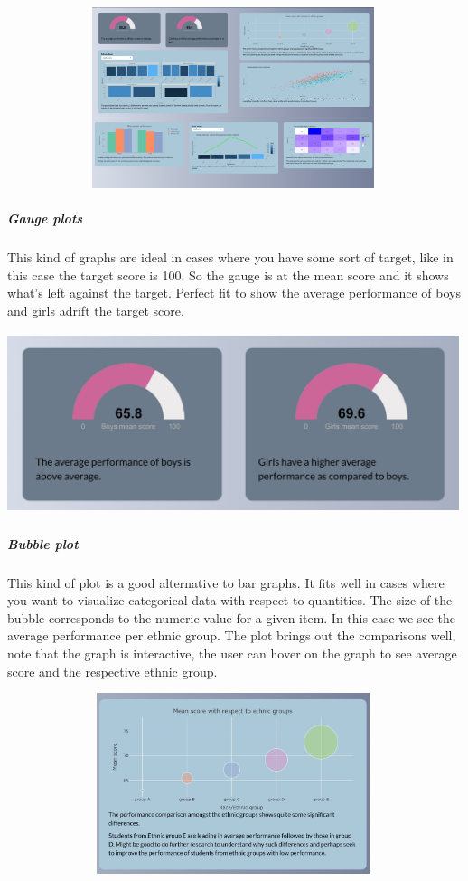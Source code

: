 \documentclass[
]{article}
\begin{document}
\includegraphics[width=5.20833in,height=2.08333in]{www/mainpanel.png}

\newpage

\hypertarget{gauge-plots}{%
\subparagraph{Gauge plots}\label{gauge-plots}}

This kind of graphs are ideal in cases where you have some sort of
target, like in this case the target score is 100. So the gauge is at
the mean score and it shows what's left against the target. Perfect fit
to show the average performance of boys and girls adrift the target
score.

\includegraphics[width=5.20833in,height=2.08333in]{www/gauge.png}

\newpage

\hypertarget{bubble-plot}{%
\subparagraph{Bubble plot}\label{bubble-plot}}

This kind of plot is a good alternative to bar graphs. It fits well in
cases where you want to visualize categorical data with respect to
quantities. The size of the bubble corresponds to the numeric value for
a given item. In this case we see the average performance per ethnic
group. The plot brings out the comparisons well, note that the graph is
interactive, the user can hover on the graph to see average score and
the respective ethnic group.

\includegraphics[width=5.20833in,height=2.08333in]{www/bubble.png}
\end{document}
